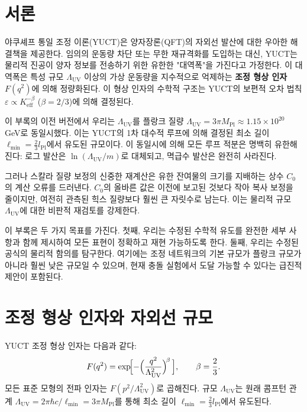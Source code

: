 \documentclass[11pt,a4paper]{article}
\newcommand{\Mpl}{M_{\mathrm{Pl}}}
\newcommand{\Lpl}{l_{\mathrm{Pl}}}
\newcommand{\Lmin}{\ell_{\min}}
\newcommand{\LUV}{\Lambda_{\mathrm{UV}}}
\theoremstyle{remark}
\begin{document}
	\vspace{0.5cm}
	
	\section{서론}
	\label{sec:intro}
	
	야쿠셰프 통일 조정 이론(YUCT)은 양자장론(QFT)의 자외선 발산에 대한 우아한 해결책을 제공한다. 임의의 운동량 차단 또는 무한 재규격화를 도입하는 대신, YUCT는 물리적 진공이 양자 정보를 전송하기 위한 유한한 "대역폭"을 가진다고 가정한다. 이 대역폭은 특성 규모 \(\LUV\) 이상의 가상 운동량을 지수적으로 억제하는 \textbf{조정 형상 인자} \(F(q^2)\)에 의해 정량화된다. 이 형상 인자의 수학적 구조는 YUCT의 보편적 오차 법칙 \(\varepsilon \propto K_{\mathrm{eff}}^{-\beta}\) (\(\beta = 2/3\))에 의해 결정된다.
	
	이 부록의 이전 버전에서 우리는 \(\LUV\)를 플랑크 질량 \(\LUV = 3\pi\Mpl \approx 1.15\times 10^{20}\) GeV로 동일시했다. 이는 YUCT의 1차 대수적 루프에 의해 결정된 최소 길이 \(\Lmin = \frac{2}{3}\Lpl\)에서 유도된 규모이다. 이 동일시에 의해 모든 루프 적분은 명백히 유한해진다: 로그 발산은 \(\ln(\LUV/m)\)로 대체되고, 멱급수 발산은 완전히 사라진다.
	
	그러나 스칼라 질량 보정의 신중한 재계산은 유한 잔여물의 크기를 지배하는 상수 \(C_0\)의 계산 오류를 드러낸다. \(C_0\)의 올바른 값은 이전에 보고된 것보다 작아 복사 보정을 줄이지만, 여전히 관측된 힉스 질량보다 훨씬 큰 자릿수로 남는다. 이는 물리적 규모 \(\LUV\)에 대한 비판적 재검토를 강제한다.
	
	이 부록은 두 가지 목표를 가진다. 첫째, 우리는 수정된 수학적 유도를 완전한 세부 사항과 함께 제시하여 모든 표현이 정확하고 재현 가능하도록 한다. 둘째, 우리는 수정된 공식의 물리적 함의를 탐구한다. 여기에는 조정 네트워크의 기본 규모가 플랑크 규모가 아니라 훨씬 낮은 규모일 수 있으며, 현재 충돌 실험에서 도달 가능할 수 있다는 급진적 제안이 포함된다.
	
	\section{조정 형상 인자와 자외선 규모}
	\label{sec:formfactor}
	
	YUCT 조정 형상 인자는 다음과 같다:
	\begin{equation}
		F(q^2) = \exp\!\Bigl[-\Bigl(\frac{q^2}{\LUV^2}\Bigr)^{\!\beta}\,\Bigr], \qquad \beta = \frac{2}{3}.
		\label{eq:F}
	\end{equation}
	모든 표준 모형의 전파 인자는 \(F(p^2/\LUV^2)\)로 곱해진다. 규모 \(\LUV\)는 원래 콤프턴 관계 \(\LUV = 2\pi\hbar c/\Lmin = 3\pi\Mpl\)를 통해 최소 길이 \(\Lmin = \frac{2}{3}\Lpl\)에서 유도된다.
	
\end{document}
